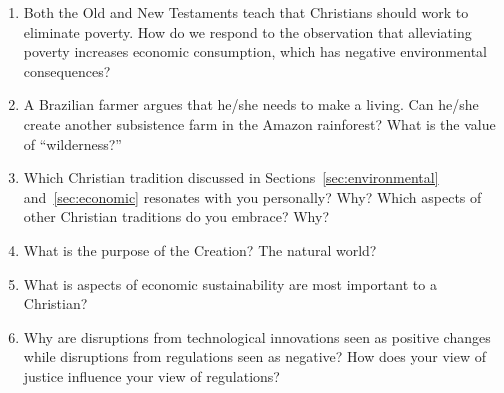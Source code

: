 \documentclass[12pt]{article}
\begin{document}
\begin{enumerate}
  \item Both the Old and New Testaments teach that Christians should work to eliminate poverty. 
        How do we respond to the observation that alleviating poverty increases economic consumption, 
		which has negative environmental consequences?
		
  \item A Brazilian farmer argues that he/she needs to make a living. 
        Can he/she create another subsistence farm in the Amazon rainforest?  
		What is the value of ``wilderness?''
		
  \item Which Christian tradition discussed in Sections~\ref{sec:environmental} and~\ref{sec:economic}
        resonates with you personally? Why? Which aspects of other Christian traditions do you embrace? Why?


		
  \item What is the purpose of the Creation? The natural world?

  \item What is aspects of economic sustainability are most important to a Christian?
  
  \item Why are disruptions from technological innovations seen as positive changes while disruptions from regulations seen as negative? 
  How does your view of justice influence your view of regulations?

\end{enumerate}




\printbibliography
\end{document}
